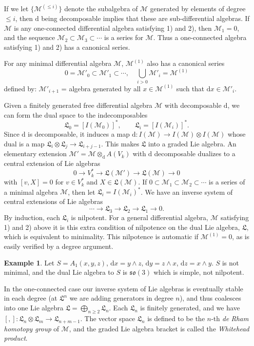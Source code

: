 \documentclass[11pt]{amsart}
\theoremstyle{plain}
\theoremstyle{definition}
\newtheorem{example}[theorem]{Example}
\newcommand{\cM}{\mathcal{M}}
\newcommand{\dd}{\mathrm{d}}
\begin{document}
If we let $\{\cM^{(\le i)}\}$ denote the subalgebra of $\cM$ generated by elements of degree $\le i$, then $\dd$ being decomposable implies that these are sub-differential algebras. If $\cM$ is any one-connected differential algebra satisfying 1) and 2), then $\cM_{1} = 0$, and the sequence $\cM_{2} \subset \cM_{3} \subset \cdots$ is a series for $\cM$. Thus a one-connected algebra satisfying 1) and 2) has a canonical series.

For any minimal differential algebra $\cM$, $\cM^{(1)}$ also has a canonical series
\[
0 = \cM'_{0} \subset \cM'_{1} \subset \cdots, \quad \bigcup_{i > 0} \cM'_{i} = \cM^{(1)}
\]
defined by: $\cM'_{i+1}$ = algebra generated by all $x \in \cM^{(1)}$ such that $\dd x \in \cM'_{i}$.

Given a finitely generated free differential algebra $\cM$ with decomposable $\dd$, we can form the dual space to the indecomposables
\[
\mathfrak{L}_{0} = [I(\cM_{0})]^{*}, \qquad \mathfrak{L}_{i} = [I(\cM_{i})]^{*}.
\]
Since $\dd$ is decomposable, it induces a map $\dd \colon I(\cM) \to I(\cM) \otimes I(\cM)$ whose dual is a map $\mathfrak{L}_{i} \otimes \mathfrak{L}_{j} \to \mathfrak{L}_{i+j-1}$. This makes $\mathfrak{L}$ into a graded Lie algebra. An elementary extension $\cM' = \cM \otimes_{\dd} A(V_{k})$ with $\dd$ decomposable dualizes to a central extension of Lie algebras
\[
0 \to V_{k}^{*} \to \mathfrak{L}(\cM') \to \mathfrak{L}(\cM) \to 0
\]
with $[v, X] = 0$ for $v \in V_{k}^{*}$ and $X \in \mathfrak{L}(\cM)$. If $0 \subset \cM_{1} \subset \cM_{2} \subset \cdots$ is a series of a minimal algebra $\cM$, then let $\mathfrak{L}_{i} = I(\cM_{i})^{*}$. We have an inverse system of central extensions of Lie algebras
\[
\cdots \to \mathfrak{L}_{3} \to \mathfrak{L}_{2} \to \mathfrak{L}_{1} \to 0.
\]
By induction, each $\mathfrak{L}_{i}$ is nilpotent. For a general differential algebra, $\cM$ satisfying 1) and 2) above it is this extra condition of nilpotence on the dual Lie algebra, $\mathfrak{L}$, which is equivalent to minimality. This nilpotence is automatic if $\cM^{(1)} = 0$, as is easily verified by a degree argument.

\begin{example}
Let $S = A_{1}(x,y,z)$, $\dd x = y \wedge z$, $\dd y = z \wedge x$, $\dd z = x \wedge y$. $S$ is not minimal, and the dual Lie algebra to $S$ is $\mathfrak{so}(3)$ which is simple, not nilpotent.
\end{example}

In the one-connected case our inverse system of Lie algebras is eventually stable in each degree (at $\mathfrak{L}^{n}$ we are adding generators in degree $n$), and thus coalesces into one Lie algebra $\mathfrak{L} = \bigoplus_{n \ge 2} \mathfrak{L}_{n}$. Each $\mathfrak{L}_{n}$ is finitely generated, and we have $[,] \colon \mathfrak{L}_{n} \otimes \mathfrak{L}_{m} \to \mathfrak{L}_{n+m-1}$. The vector space $\mathfrak{L}_{n}$ is defined to be the $n$-th \emph{de Rham homotopy group} of $\cM$, and the graded Lie algebra bracket is called the \emph{Whitehead product}.
\end{document}
